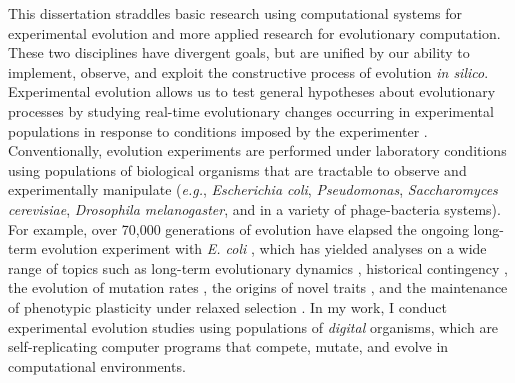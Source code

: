 


This dissertation straddles basic research using computational systems for experimental evolution and more applied research for evolutionary computation.
These two disciplines have divergent goals, but are unified by our ability to implement, observe, and exploit the constructive process of evolution \textit{in silico}.
Experimental evolution allows us to test general hypotheses about evolutionary processes by studying real-time evolutionary changes occurring in experimental populations in response to conditions imposed by the experimenter \citep{kawecki_experimental_2012}.
Conventionally, evolution experiments are performed under laboratory conditions using populations of biological organisms that are tractable to observe and experimentally manipulate (\textit{e.g.}, \textit{Escherichia coli}, \textit{Pseudomonas}, \textit{Saccharomyces cerevisiae}, \textit{Drosophila melanogaster}, and in a variety of phage-bacteria systems).
For example, over 70,000 generations of evolution have elapsed the ongoing long-term evolution experiment with \textit{E. coli} \citep{barrick_test_2020}, which has yielded analyses on a wide range of topics such as
long-term evolutionary dynamics \citep{wiser_long-term_2013,good_dynamics_2017},
historical contingency \citep{travisano_experimental_1995,card_historical_2019},
the evolution of mutation rates \citep{sniegowski_evolution_1997},
the origins of novel traits \citep{blount_historical_2008},
and the maintenance of phenotypic plasticity under relaxed selection \citep{grant_maintenance_2020}.
In my work, I conduct experimental evolution studies using populations of \textit{digital} organisms, which are self-replicating computer programs that compete, mutate, and evolve in computational environments.



